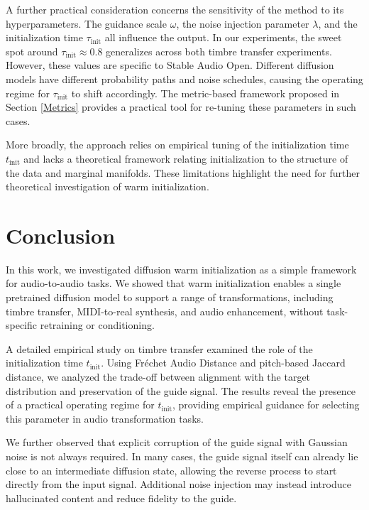 \documentclass[twoside,a4paper]{article}
\begin{document}
A further practical consideration concerns the sensitivity of the method to its hyperparameters. The guidance scale $\omega$, the noise injection parameter $\lambda$, and the initialization time $\tau_\text{init}$ all influence the output. In our experiments, the sweet spot around $\tau_\text{init} \approx 0.8$ generalizes across both timbre transfer experiments. However, these values are specific to Stable Audio Open. Different diffusion models have different probability paths and noise schedules, causing the operating regime for $\tau_\text{init}$ to shift accordingly.  The metric-based framework proposed in Section \ref{Metrics} provides a practical tool for re-tuning these parameters in such cases.

More broadly, the approach relies on empirical tuning of the initialization time $t_\text{init}$ and lacks a theoretical framework relating initialization to the structure of the data and marginal manifolds. These limitations highlight the need for further theoretical investigation of warm initialization.

\section{Conclusion}

\label{conclusion}
In this work, we investigated diffusion warm initialization as a simple framework for audio-to-audio tasks. We showed that warm initialization enables a single pretrained diffusion model to support a range of transformations, including timbre transfer, MIDI-to-real synthesis, and audio enhancement, without task-specific retraining or conditioning. 

A detailed empirical study on timbre transfer examined the role of the initialization time $t_\text{init}$. Using Fréchet Audio Distance and pitch-based Jaccard distance, we analyzed the trade-off between alignment with the target distribution and preservation of the guide signal. The results reveal the presence of a practical operating regime for $t_\text{init}$, providing empirical guidance for selecting this parameter in audio transformation tasks.

We further observed that explicit corruption of the guide signal with Gaussian noise is not always required. In many cases, the guide signal itself can already lie close to an intermediate diffusion state, allowing the reverse process to start directly from the input signal. Additional noise injection may instead introduce hallucinated content and reduce fidelity to the guide.
\end{document}
